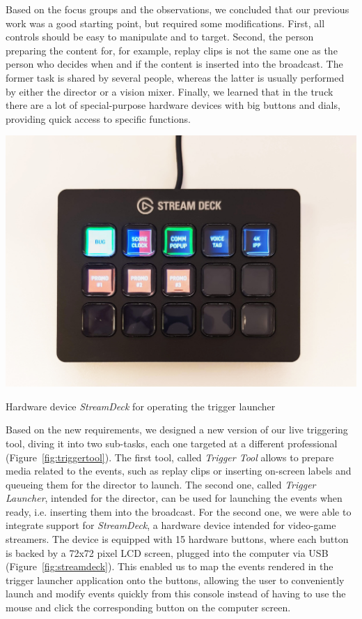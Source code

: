 \documentclass[sigchi-a, authorversion]{acmart}
\begin{document}
Based on the focus groups and the observations, we concluded that our previous
work was a good starting point, but required some modifications. First, all
controls should be easy to manipulate and to target. Second, the person
preparing the content for, for example, replay clips is not the same one as the
person who decides when and if the content is inserted into the broadcast. The
former task is shared by several people, whereas the latter is usually performed
by either the director or a vision mixer. Finally, we learned that in the truck
there are a lot of special-purpose hardware devices with big buttons and dials,
providing quick access to specific functions.

\begin{marginfigure}
    \includegraphics[width=\marginparwidth-10pt]{Figures/streamdeck.jpg}
    \caption{Hardware device \emph{StreamDeck} for operating the trigger launcher}
    \label{fig:streamdeck}
\end{marginfigure}

Based on the new requirements, we designed a new version of our live triggering
tool, diving it into two sub-tasks, each one targeted at a different professional
(Figure~\ref{fig:triggertool}). The first tool, called \emph{Trigger Tool} allows to prepare media
related to the events, such as replay clips or inserting on-screen labels and queueing
them for the director to launch. The second one, called \emph{Trigger Launcher}, intended for the director, can
be used for launching the events when ready, i.e. inserting them into the broadcast.
For the second one, we were able to integrate support for \emph{StreamDeck}, a 
hardware device intended for video-game streamers. The device is equipped with 15
hardware buttons, where each button is backed by a 72x72 pixel LCD screen, plugged into the computer via USB
(Figure~\ref{fig:streamdeck}). This enabled us to map the events rendered in the
trigger launcher application onto the buttons, allowing the user to conveniently launch and
modify events quickly from this console instead of having to use the mouse and
click the corresponding button on the computer screen.
\end{document}
